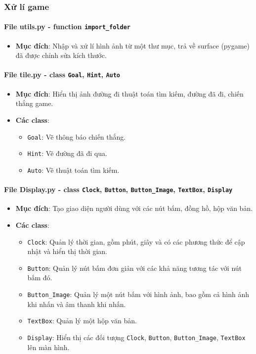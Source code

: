 \subsubsection{Xử lí game}

\paragraph{File utils.py - function \texttt{import\_folder}}
\begin{itemize}
    \item \textbf{Mục đích}: Nhập và xử lí hình ảnh từ một thư mục, trả về surface (pygame) đã được chỉnh sửa kích thước.
\end{itemize}

\paragraph{File tile.py - class \texttt{Goal}, \texttt{Hint}, \texttt{Auto}}
\begin{itemize}
    \item \textbf{Mục đích}: Hiển thị ảnh đường đi thuật toán tìm kiếm, đường đã đi, chiến thắng game.
    \item \textbf{Các class}:
    \begin{itemize}
        \item \texttt{Goal}: Vẽ thông báo chiến thắng.
        \item \texttt{Hint}: Vẽ đường đã đi qua.
        \item \texttt{Auto}: Vẽ thuật toán tìm kiếm.
    \end{itemize}
\end{itemize}

\paragraph{File Display.py - class \texttt{Clock}, \texttt{Button}, \texttt{Button\_Image}, \texttt{TextBox}, \texttt{Display}}
\begin{itemize}
    \item \textbf{Mục đích}: Tạo giao diện người dùng với các nút bấm, đồng hồ, hộp văn bản.
    \item \textbf{Các class}:
    \begin{itemize}
        \item \texttt{Clock}: Quản lý thời gian, gồm phút, giây và có các phương thức để cập nhật và hiển thị thời gian.
        \item \texttt{Button}: Quản lý nút bấm đơn giản với các khả năng tương tác với nút bấm đó.
        \item \texttt{Button\_Image}: Quản lý một nút bấm với hình ảnh, bao gồm cả hình ảnh khi nhấn và âm thanh khi nhấn.
        \item \texttt{TextBox}: Quản lý một hộp văn bản.
        \item \texttt{Display}: Hiển thị các đối tượng \texttt{Clock}, \texttt{Button}, \texttt{Button\_Image}, \texttt{TextBox} lên màn hình.
    \end{itemize}
\end{itemize}


